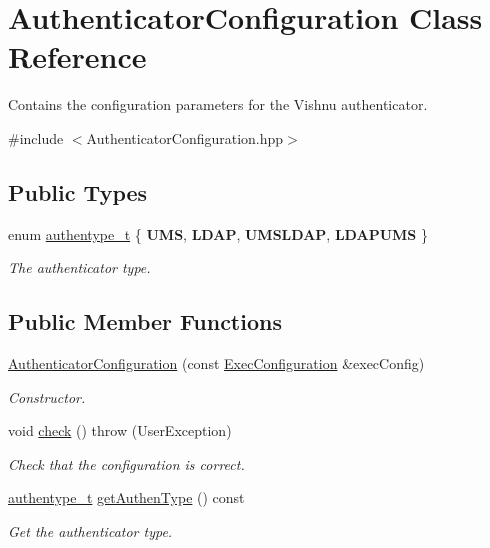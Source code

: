 \hypertarget{classAuthenticatorConfiguration}{
\section{AuthenticatorConfiguration Class Reference}
\label{classAuthenticatorConfiguration}
}


Contains the configuration parameters for the Vishnu authenticator.  




{\ttfamily \#include $<$AuthenticatorConfiguration.hpp$>$}

\subsection*{Public Types}
\begin{DoxyCompactItemize}
\item 
enum \hyperlink{classAuthenticatorConfiguration_ae99c4f5893fb52077ccfce3b0c09c973}{authentype\_\-t} \{ {\bfseries UMS}, 
{\bfseries LDAP}, 
{\bfseries UMSLDAP}, 
{\bfseries LDAPUMS}
 \}
\begin{DoxyCompactList}\small\item\em The authenticator type. \item\end{DoxyCompactList}\end{DoxyCompactItemize}
\subsection*{Public Member Functions}
\begin{DoxyCompactItemize}
\item 
\hyperlink{classAuthenticatorConfiguration_aa05395e9818ff1bc709da5ad3c967271}{AuthenticatorConfiguration} (const \hyperlink{classExecConfiguration}{ExecConfiguration} \&execConfig)
\begin{DoxyCompactList}\small\item\em Constructor. \item\end{DoxyCompactList}\item 
\hypertarget{classAuthenticatorConfiguration_aa0a3f4e490d2720409ea639e05ebfe04}{
void \hyperlink{classAuthenticatorConfiguration_aa0a3f4e490d2720409ea639e05ebfe04}{check} ()  throw (UserException)}
\label{classAuthenticatorConfiguration_aa0a3f4e490d2720409ea639e05ebfe04}

\begin{DoxyCompactList}\small\item\em Check that the configuration is correct. \item\end{DoxyCompactList}\item 
\hyperlink{classAuthenticatorConfiguration_ae99c4f5893fb52077ccfce3b0c09c973}{authentype\_\-t} \hyperlink{classAuthenticatorConfiguration_aada879ea10e5544be5d5812e1f7abd53}{getAuthenType} () const 
\begin{DoxyCompactList}\small\item\em Get the authenticator type. \item\end{DoxyCompactList}\end{DoxyCompactItemize}
